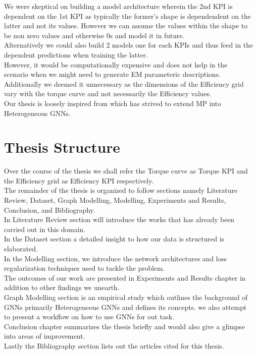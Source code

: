 \documentclass{report} %
\begin{document}
We were skeptical on building a model architecture wherein the 2nd KPI is dependent on the 1st KPI as typically the former's shape is dependendent on the latter and not its values.
However we can assume the values within the shape to be non zero values and otherwise 0s and model it in future.\\

Alternatively we could also build 2 models one for each KPIs and thus feed in the dependent predictions when training the latter. \\
However, it would be computationally expensive and does not help in the scenario when we might need to generate \ac{EM} parameteric descriptions.
Additionally we deemed it unnecessary as the dimensions of the Efficiency grid vary with the torque curve and not necessarily the Efficiency values. \\

Our thesis is loosely inspired from \cite{ML HGNN-2023} which has strived to extend \ac{MP} into Heterogeneous \ac{GNN}s.\\

\section{Thesis Structure}\label{sec:Thesis Structure}

Over the course of the thesis we shall refer the Torque curve as Torque KPI and the Efficiency grid as Efficiency KPI respectively.\\
The remainder of the thesis is organized to follow sections namely Literature Review, Dataset, Graph Modelling, Modelling, Experiments and Results, Conclusion, and Bibliography.\\
In Literature Review section will introduce the works that has already been carried out in this domain. \\
In the Dataset section a detailed insight to how our data is structured is elaborated.\\
In the Modelling section, we introduce the network architectures and loss regularization techniques used to tackle the problem. \\
The outcomes of our work are presented in Experiments and Results chapter in addition to other findings we unearth.\\ 
Graph Modelling section is an empirical study which outlines the background of \ac{GNN}s primarily Heterogeneous \ac{GNN}s and defines its concepts.
we also attempt to present a workflow on how to use \ac{GNN}s for out task.\\
Conclusion chapter summarizes the thesis briefly and would also give a glimpse into areas of improvement. \\
Lastly the Bibliography section lists out the articles cited for this thesis.\\
\end{document}
